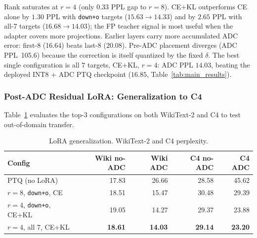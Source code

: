 \documentclass[a4paper,11pt,oneside]{article}
\theoremstyle{breakstyle}
\begin{document}
  Rank saturates at $r=4$ (only 0.33 PPL gap to $r=8$).
  CE$+$KL outperforms CE alone by $1.30$ PPL with \texttt{down+o}
  targets ($15.63 \to 14.33$) and by $2.65$ PPL with all-7 targets
  ($16.68 \to 14.03$); the FP teacher signal is most useful when the
  adapter covers more projections.
  Earlier layers carry more accumulated ADC error: first-8 (16.64) beats
  last-8 (20.08).
  Pre-ADC placement diverges (ADC PPL~105.6) because the
  correction is itself quantized by the fixed $\delta$.
  The best single configuration is all 7 targets, CE$+$KL, $r=4$: ADC
  PPL $14.03$, beating the deployed INT8 + ADC PTQ checkpoint
  ($16.85$, Table~\ref{tab:main_results}).


  \subsubsection{Post-ADC Residual LoRA: Generalization to C4}
  \label{sec:lora_c4}

  Table~\ref{tab:lorav8} evaluates the top-3 configurations on both
  WikiText-2 and C4 to test out-of-domain transfer.

  \begin{table}[htbp]
    \centering
    \caption{LoRA generalization. WikiText-2 and C4 perplexity.}
    \label{tab:lorav8}
    \renewcommand{\arraystretch}{1.15}
    \begin{tabular}{@{}lrrrr@{}}
      \toprule
      \textbf{Config} & \textbf{Wiki no-ADC} & \textbf{Wiki ADC} & \textbf{C4 no-ADC} & \textbf{C4 ADC} \\
      \midrule
      PTQ (no LoRA)              & 17.83 & 26.66 & 28.58 & 45.62 \\
      $r=8$, \texttt{down+o}, CE & 18.51 & 15.47 & 30.48 & 29.39 \\
      $r=4$, \texttt{down+o}, CE+KL & 19.05 & 14.27 & 29.37 & 23.88 \\
      $r=4$, all 7, CE+KL        & \textbf{18.61} & \textbf{14.03} & \textbf{29.14} & \textbf{23.20} \\
      \bottomrule
    \end{tabular}
  \end{table}
\end{document}

